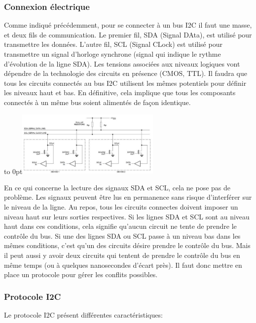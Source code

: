 \documentclass[french,a4paper,12pt]{report}
\begin{document}
  		\subsubsection{Connexion électrique}
  		
  		Comme indiqué précédemment, pour se connecter à un bus I2C il faut une masse, et deux fils de communication. Le premier fil, SDA (Signal DAta), est utilisé pour transmettre les données. L'autre fil, SCL (Signal CLock) est utilisé pour transmettre un signal d'horloge synchrone (signal qui indique le rythme d'évolution de la ligne SDA). Les tensions associées aux niveaux logiques vont dépendre de la technologie des circuits en présence (CMOS, TTL). Il faudra que tous les circuits connectés au bus I2C utilisent les mêmes potentiels pour définir les niveaux haut et bas. En définitive, cela implique que tous les composants connectés à un même bus soient alimentés de façon identique.
 
			\hfill\hbox to 0pt{\hss\includegraphics[width=7cm]{SPI5.png}\hss}\hfill\null\newline
 
En ce qui concerne la lecture des signaux SDA et SCL, cela ne pose pas de problème. Les signaux peuvent être lus en permanence sans risque d'interférer sur le niveau de la ligne.
Au repos, tous les circuits connectes doivent imposer un niveau haut sur leurs sorties respectives. Si les lignes SDA et SCL sont au niveau haut dans ces conditions, cela signifie qu'aucun circuit ne tente de prendre le contrôle du bus. Si une des lignes SDA ou SCL passe à un niveau bas dans les mêmes conditions, c'est qu'un des circuits désire prendre le contrôle du bus. Mais il peut aussi y avoir deux circuits qui tentent de prendre le contrôle du bus en même temps (ou à quelques nanosecondes d'écart près). Il faut donc mettre en place un protocole pour gérer les conflits possibles.

   		\subsubsection{Protocole I2C}
	Le protocole I2C présent différentes caractéristiques:
 
\end{document}
